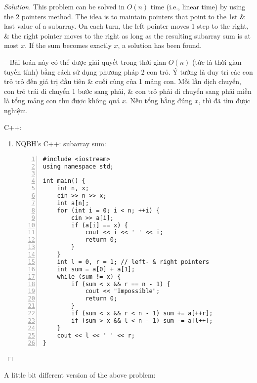 \documentclass{article}
\begin{document}
\begin{proof}[Solution]
    This problem can be solved in $O(n)$ time (i.e., linear time) by using the 2 pointers method. The idea is to maintain pointers that point to the 1st \& last value of a subarray. On each turn, the left pointer moves 1 step to the right, \& the right pointer moves to the right as long as the resulting subarray sum is at most $x$. If the sum becomes exactly $x$, a solution has been found.

    -- Bài toán này có thể được giải quyết trong thời gian $O(n)$ (tức là thời gian tuyến tính) bằng cách sử dụng phương pháp 2 con trỏ. Ý tưởng là duy trì các con trỏ trỏ đến giá trị đầu tiên \& cuối cùng của 1 mảng con. Mỗi lần dịch chuyển, con trỏ trái di chuyển 1 bước sang phải, \& con trỏ phải di chuyển sang phải miễn là tổng mảng con thu được không quá $x$. Nếu tổng bằng đúng $x$, thì đã tìm được nghiệm.

    C++:
    \begin{enumerate}
        \item NQBH's C++: subarray sum:
        \begin{Verbatim}[numbers=left,xleftmargin=0mm]
#include <iostream>
using namespace std;

int main() {
    int n, x;
    cin >> n >> x;
    int a[n];
    for (int i = 0; i < n; ++i) {
        cin >> a[i];
        if (a[i] == x) {
            cout << i << ' ' << i;
            return 0;
        }
    }
    int l = 0, r = 1; // left- & right pointers
    int sum = a[0] + a[1];
    while (sum != x) {
        if (sum < x && r == n - 1) {
            cout << "Impossible";
            return 0;
        }
        if (sum < x && r < n - 1) sum += a[++r];
        if (sum > x && l < n - 1) sum -= a[l++];
    }
    cout << l << ' ' << r;
}
        \end{Verbatim}
    \end{enumerate}
\end{proof}
A little bit different version of the above problem:
\end{document}
